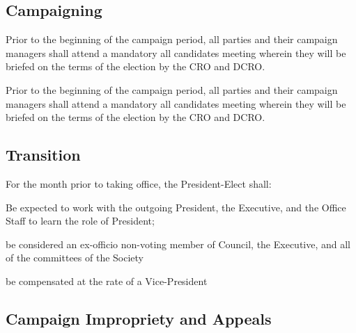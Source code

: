 \subsection{Campaigning}
\begin{longenum}[ label*=\thesubsection.\arabic*., align=left]
    \item Prior to the beginning of the campaign period, all parties and their campaign
managers shall attend a mandatory all candidates meeting wherein they will be briefed on the terms of the election by the CRO and DCRO.
	\item Prior to the beginning of the campaign period, all parties and their campaign managers shall attend a mandatory all candidates meeting wherein they will be briefed on the terms of the election by the CRO and DCRO.
\end{longenum}


\subsection{Transition}

\begin{longenum}[ label*=\thesubsection.\arabic*., align=left]
	\item For the month prior to taking office, the President-Elect shall:
	 \begin{longenum}[ label*=\thesubsection.\arabic*., align=left]
	\item Be expected to work with the outgoing President, the Executive, and the Office Staff to learn the role of President;
	\item be considered an ex-officio non-voting member of Council, the Executive, and all of the committees of the Society
	\item  be compensated at the rate of a Vice-President
	 

\end{longenum}

\end{longenum}

\subsection{Campaign Impropriety and Appeals}

